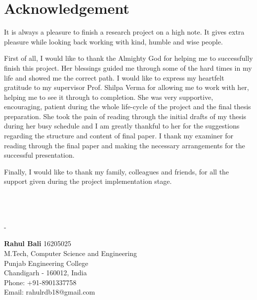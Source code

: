 \section*{Acknowledgement}
It is always a pleasure to finish a research project on a high note. It gives extra pleasure while looking back working with kind, humble and wise people. 

First of all, I would like to thank the Almighty God for helping me to successfully finish this project. Her blessings guided me through some of the hard times in my life and showed me the correct path. I would like to express my heartfelt gratitude to my supervisor Prof. Shilpa Verma for allowing me to work with her, helping me to see it through to completion. She was very supportive, encouraging, patient during the whole life-cycle of the project and the final thesis preparation. She took the pain of reading through the initial drafts of my thesis during her busy schedule and I am greatly thankful to her for the suggestions regarding the structure and content of final paper. I thank my examiner for reading through the final paper and making the necessary arrangements for the successful presentation.

Finally, I would like to thank my family, colleagues and friends, for all the support given during the project implementation stage.\\\\\\\\

\begin{minipage}{0.4\textwidth}
-
\end{minipage}%
\begin{minipage}{0.6\textwidth}
\textbf{Rahul Bali} 16205025\\
M.Tech, Computer Science and Engineering\\
Punjab Engineering College\\
Chandigarh - 160012, India\\
Phone: +91-8901337758\\
Email: rahulrdb18@gmail.com 
\end{minipage}
